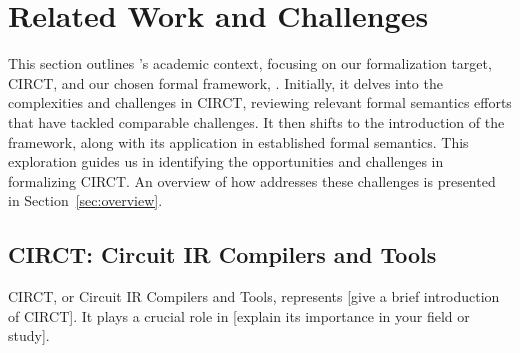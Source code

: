 

\section{Related Work and Challenges}
\label{sec:related-work-challenges}

This section outlines {\ourStudy}'s academic context, focusing on our formalization target, CIRCT, and our chosen formal framework, {\K}. Initially, it delves into the complexities and challenges in CIRCT, reviewing relevant formal semantics efforts that have tackled comparable challenges. It then shifts to the introduction of the {\K} framework, along with its application in established formal semantics. This exploration guides us in identifying the opportunities and challenges in formalizing CIRCT. An overview of how {\ourStudy} addresses these challenges is presented in Section~\ref{sec:overview}.


\subsection{CIRCT: Circuit IR Compilers and Tools}

CIRCT, or Circuit IR Compilers and Tools, represents [give a brief introduction of CIRCT]. It plays a crucial role in [explain its importance in your field or study].



